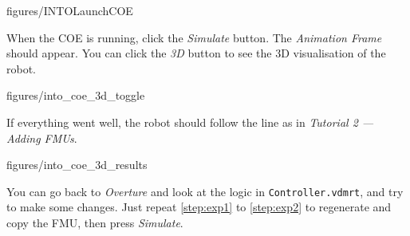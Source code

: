 \documentclass[11pt,a4paper]{../tutorial}
\begin{document}
\begin{instructions}
    \begin{annotation}[width=0.85\linewidth,trim=0 270 0 120,clip]{figures/INTOLaunchCOE}
    \end{annotation}

\item When the COE is running, click the \emph{Simulate} button. The \emph{Animation Frame} should appear. You can click the \emph{3D} button to see the 3D visualisation of the robot.

    \begin{annotation}[width=0.55\linewidth,trim=0 0 0 0,clip]{figures/into_coe_3d_toggle}
    \end{annotation}

\item If everything went well, the robot should follow the line as in \emph{Tutorial 2 --- Adding FMUs}.

    \begin{annotation}[width=0.55\linewidth,trim=0 300 0 0,clip]{figures/into_coe_3d_results}
    \end{annotation}

    You can go back to \emph{Overture} and look at the logic in \texttt{Controller.vdmrt}, and try to make some changes. Just repeat \ref{step:exp1} to \ref{step:exp2} to regenerate and copy the FMU, then press \emph{Simulate}.

\end{instructions}
\end{document}
